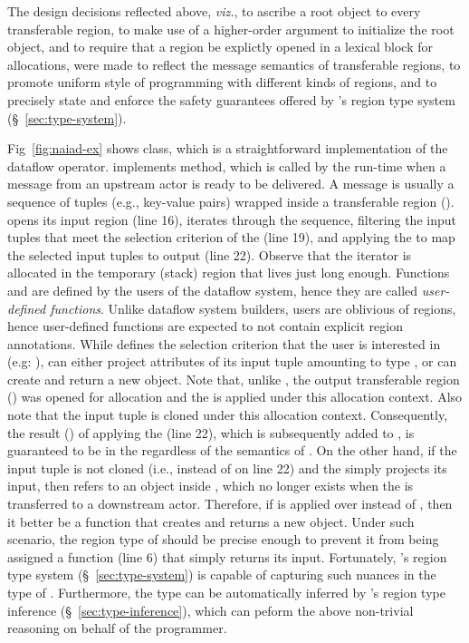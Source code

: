 The design decisions reflected above, \emph{viz.}, to ascribe a root
object to every transferable region, to make use of a higher-order
argument to initialize the root object, and to require that a region
be explictly opened in a lexical block for allocations, were made to
reflect the message semantics of transferable regions, to promote
uniform style of programming with different kinds of regions, and to
precisely state and enforce the safety guarantees offered by \name's
region type system (\S~\ref{sec:type-system}).



Fig~\ref{fig:naiad-ex} shows  class, which is a
straightforward implementation of the  dataflow operator.
 implements  method, which is called by
the run-time when a message from an upstream actor is ready to be
delivered. A message is usually a sequence of tuples (e.g., key-value
pairs) wrapped inside a transferable region ().
 opens its input region  (line 16), iterates
through the sequence, filtering the input tuples that meet the
selection criterion of the  (line 19), and applying the
 to map the selected input tuples to output (line 22).
Observe that the iterator is allocated in the temporary (stack) region
 that lives just long enough.  Functions  and
 are defined by the users of the dataflow system, hence
they are called \emph{user-defined functions}.  Unlike dataflow system
builders, users are oblivious of regions, hence user-defined functions
are expected to not contain explicit region annotations. While
 defines the selection criterion that the user is
interested in (e.g: ),  can either project
attributes of its input tuple amounting to type , or can
create and return a new  object. Note that, unlike ,
the output transferable region () was opened for allocation
and the  is applied under this allocation context. Also note
that the input tuple is cloned under this allocation context.
Consequently, the result () of applying the  (line
22), which is subsequently added to , is guaranteed to be in
the  regardless of the semantics of . On the other
hand, if the input tuple is not cloned (i.e.,  instead of
 on line 22) and the  simply projects its
input, then  refers to an object inside , which no
longer exists when the  is transferred to a downstream
actor. Therefore, if  is applied over  instead of
, then it better be a function that creates and returns
a new  object. Under such scenario, the region type of
 should be precise enough to prevent it from
being assigned a function (line 6) that simply returns its input.
Fortunately, \name's region type system (\S~\ref{sec:type-system}) is
capable of capturing such nuances in the type of
. Furthermore, the type can be automatically
inferred by \name's region type inference
(\S~\ref{sec:type-inference}), which can peform the above non-trivial
reasoning on behalf of the programmer.

